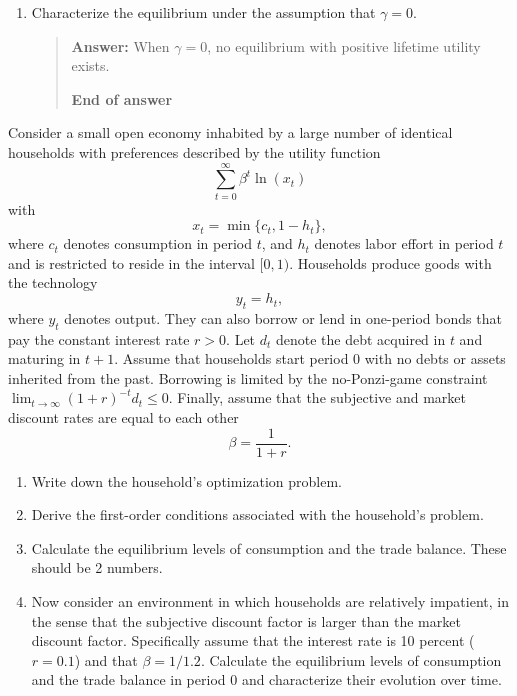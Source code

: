 \begin{exercise}
\begin{enumerate}
\item Characterize the equilibrium under the assumption that $\gamma=0$. 
\begin{quote}
{\bf Answer: } 
 When $\gamma=0$, no equilibrium with positive lifetime utility exists.


{\bf End of answer}
\end{quote}

\end{enumerate}  
\end{exercise}

\begin{exercise}

 Consider a small open economy inhabited by a large number of identical households with preferences described by the utility function
\[
\sum_{t=0}^{\infty} \beta^t \ln( x_t)
\]
with 
\[
x_t = \min\{c_t,1-h_t\},
\]
where $c_t$ denotes consumption in period $t$, 
and $h_t$ denotes labor effort
in period $t$ and is restricted to  reside in the interval $[0,1)$. 
Households  produce goods with  the technology 
\[
y_t=h_t,
\]
 where $y_t$ denotes output. They can also borrow or lend 
in one-period bonds that pay  the constant interest rate $r>0$. Let $d_t$ denote the debt acquired in $t$ and maturing in $t+1$. Assume that  households start period 0 with no debts or assets inherited from the past.  Borrowing is limited by the no-Ponzi-game constraint $\lim_{t\rightarrow \infty}(1+r)^{-t}d_t\le0$. Finally, assume that the subjective and market discount rates are equal to each other
\[\beta = \frac1{1+r}.\]

\begin{enumerate}
\item Write down the household's optimization problem. 
\item Derive the first-order conditions associated with the household's problem.
\item Calculate the equilibrium levels of consumption and the trade balance. These should  be 2 numbers. 
\item Now consider an environment  in which households are relatively impatient, in the sense that the subjective discount factor is larger than the market discount factor. Specifically assume that the interest rate is 10 percent ($r=0.1$) and that $\beta=1/1.2$.  Calculate the equilibrium levels  of consumption and the trade balance in period 0 and characterize their evolution over time. 
\end{enumerate}


\end{exercise}
